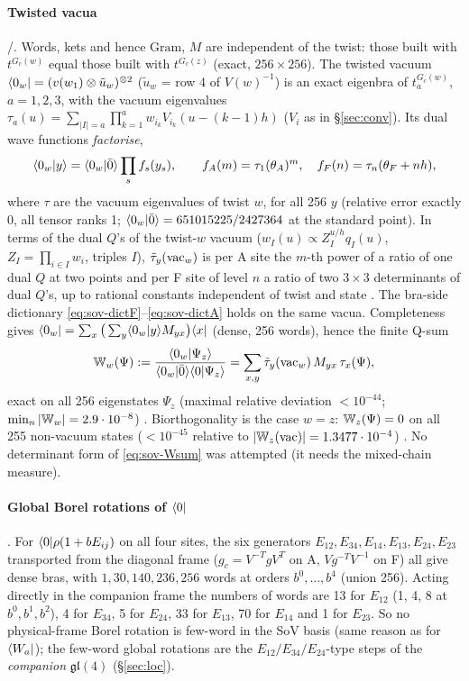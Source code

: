\paragraph{Twisted vacua} \ex/\hp. Words, kets and hence $\mathrm{Gram}$, $M$ are independent of the twist: those built with $t^{G_c(w)}$ equal those built with $t^{G_c(z)}$ (exact, $256\times256$). The twisted vacuum
$\langle0_w|=(v(w_1)\otimes\tilde u_w)^{\otimes2}$ ($\tilde u_w$ = row 4 of $V(w)^{-1}$) is an exact eigenbra of $t_a^{G_c(w)}$, $a=1,2,3$, with the vacuum eigenvalues $\tau_a(u)=\sum_{|I|=a}\prod_{k=1}^aw_{i_k}V_{i_k}(u-(k-1)h)$ ($V_i$ as in \S\ref{sec:conv}). Its dual wave functions \emph{factorise},
\begin{equation}
 \langle0_w|y\rangle=\langle0_w|\bar0\rangle\prod_sf_s(y_s),\qquad f_A(m)=\tau_1(\theta_A)^m,\quad f_F(n)=\tau_n(\theta_F+n h),
\end{equation}
where $\tau$ are the vacuum eigenvalues of twist $w$, for all 256 $y$ (relative error exactly 0, all tensor ranks 1; $\langle0_w|\bar0\rangle=651015225/2427364$ at the standard point). In terms of the dual $Q$'s of the twist-$w$ vacuum ($w_I(u)\propto Z_I^{u/h}q_I(u)$, $Z_I=\prod_{i\in I}w_i$, triples $I$), $\tilde\tau_y(\mathrm{vac}_w)$ is per A site the $m$-th power of a ratio of one dual $Q$ at two points and per F site of level $n$ a ratio of two
$3\times3$ determinants of dual $Q$'s, up to rational constants independent of twist and state \ex. The bra-side dictionary \eqref{eq:sov-dictF}--\eqref{eq:sov-dictA} holds on the same vacua. Completeness gives $\langle0_w|=\sum_x\big(\sum_y\langle0_w|y\rangle M_{yx}\big)\langle x|$
(dense, 256 words), hence the finite Q-sum
\begin{equation}\label{eq:sov-Wsum}
 \mathbb W_w(\Psi):=\frac{\langle0_w|\Psi_z\rangle}{\langle0_w|\bar0\rangle\langle0|\Psi_z\rangle}=\sum_{x,y}\tilde\tau_y(\mathrm{vac}_w)\,M_{yx}\,\tau_x(\Psi),
\end{equation}
exact on all 256 eigenstates $\Psi_z$ (maximal relative deviation $<10^{-44}$; $\min_n|\mathbb W_w|=2.9\cdot10^{-8}$) \hp. Biorthogonality is the case $w=z$: $\mathbb W_z(\Psi)=0$ on all 255 non-vacuum states ($<10^{-45}$ relative to $|\mathbb W_z(\mathrm{vac})|=1.3477\cdot10^{-4}$) \hp.
No determinant form of \eqref{eq:sov-Wsum} was attempted (it needs the mixed-chain measure).

\paragraph{Global Borel rotations of $\langle0|$} \ex. For $\langle0|\rho(1+bE_{ij})$ on all four sites, the six generators $E_{12},E_{34},E_{14},E_{13},E_{24},E_{23}$ transported from the
diagonal frame ($g_c=V^{-T}gV^T$ on A, $Vg^{-T}V^{-1}$ on F) all give dense bras, with $1,30,140,236,256$ words at orders $b^0,\dots,b^4$ (union 256). Acting directly in the companion frame the numbers of words are
13 for $E_{12}$ (1, 4, 8 at $b^0,b^1,b^2$), 4 for $E_{34}$, 5 for $E_{24}$, 33 for $E_{13}$, 70 for $E_{14}$ and 1 for $E_{23}$. So no physical-frame Borel rotation is few-word in the SoV basis (same reason as for $\langle W_a|$); the few-word global
rotations are the $E_{12}/E_{34}/E_{24}$-type steps of the \emph{companion} $\mathfrak{gl}(4)$ (\S\ref{sec:loc}).

